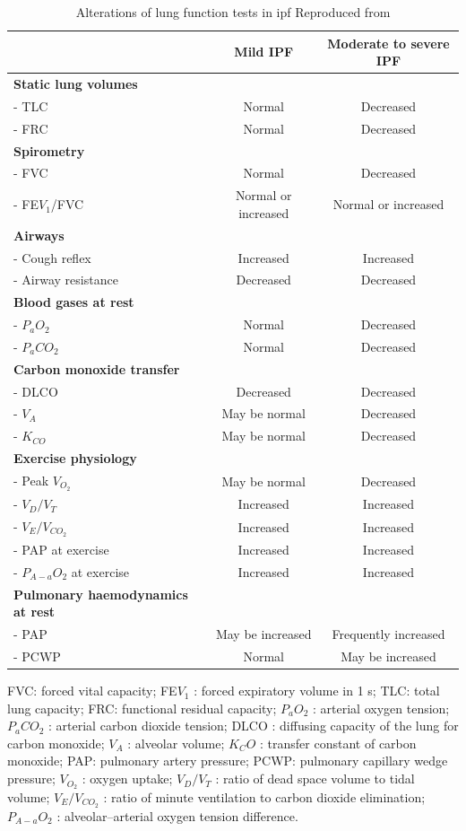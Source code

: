 \begin{table}[htbp]
\centering
\caption{Alterations of lung function tests in \gls{ipf} Reproduced from \citep{plantier2018physiology}}
\label{tab:IPFPhysiologicAlterations}
\begin{tabular}{l c c}
\hline
  & \bf{Mild IPF} & \bf{Moderate to severe IPF} \\ 
\hline
\bf{Static lung volumes} &  &  \\
- TLC & Normal & Decreased\\
- FRC & Normal & Decreased\\
\hline
\bf{Spirometry} &  &  \\
- FVC & Normal & Decreased\\
- FE$V_1$/FVC & Normal or increased & Normal or increased\\
\hline
\bf{Airways} &  &  \\
- Cough reflex & Increased & Increased\\
- Airway resistance & Decreased & Decreased\\
\hline
\bf{Blood gases at rest} &  &  \\
- $P_aO_2$ & Normal & Decreased\\
- $P_aCO_2$ & Normal & Decreased\\
\hline
\bf{Carbon monoxide transfer} &  &  \\
- DLCO & Decreased & Decreased\\
- $V_A$ & May be normal & Decreased\\
- $K_{CO}$ & May be normal & Decreased\\
\hline
\bf{Exercise physiology} &  &  \\
- Peak $V_{O_2}$ & May be normal & Decreased\\
- $V_D/V_T$ & Increased & Increased\\
- $V_E/V_{CO_2}$ & Increased & Increased\\
- PAP at exercise & Increased & Increased\\
- $P_{A-a} O_2$ at exercise & Increased & Increased\\
\hline
\bf{Pulmonary haemodynamics at rest} &  &  \\
- PAP & May be increased & Frequently increased\\
- PCWP & Normal & May be increased\\
\hline
\end{tabular}
\begin{tablenotes}
        \footnotesize
        \item{FVC: forced vital capacity; FE$V_1$ : forced expiratory volume in 1 s; TLC: total lung capacity; FRC: functional residual capacity; $P_aO_2$ : arterial oxygen tension; $P_aCO_2$ : arterial carbon dioxide tension; DLCO : diffusing capacity of the lung for carbon monoxide; $V_A$ : alveolar volume; $K_CO$ : transfer constant of carbon monoxide; PAP: pulmonary artery pressure; PCWP: pulmonary capillary wedge pressure; $V_{O_2}$ : oxygen uptake; $V_D/V_T$ : ratio of dead space volume to tidal volume; $V_E/V_{CO_2}$ : ratio of minute ventilation to carbon dioxide elimination; $P_{A-a} O_2$ : alveolar–arterial oxygen tension difference.}
\end{tablenotes}
\end{table}

